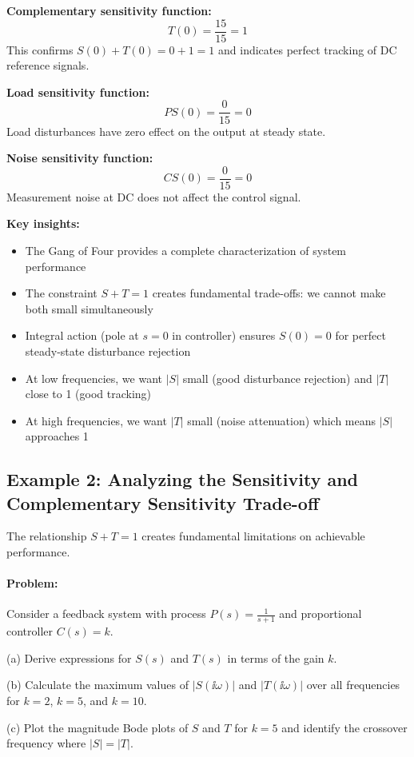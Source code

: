 \documentclass[11pt,a4paper]{article}
\begin{document}
\textbf{Complementary sensitivity function:}
\[
T(0) = \frac{15}{15} = 1
\]
This confirms $S(0) + T(0) = 0 + 1 = 1$ and indicates perfect tracking of DC reference signals.

\textbf{Load sensitivity function:}
\[
PS(0) = \frac{0}{15} = 0
\]
Load disturbances have zero effect on the output at steady state.

\textbf{Noise sensitivity function:}
\[
CS(0) = \frac{0}{15} = 0
\]
Measurement noise at DC does not affect the control signal.

\textbf{Key insights:}
\begin{itemize}
\item The Gang of Four provides a complete characterization of system performance
\item The constraint $S + T = 1$ creates fundamental trade-offs: we cannot make both small simultaneously
\item Integral action (pole at $s=0$ in controller) ensures $S(0) = 0$ for perfect steady-state disturbance rejection
\item At low frequencies, we want $|S|$ small (good disturbance rejection) and $|T|$ close to 1 (good tracking)
\item At high frequencies, we want $|T|$ small (noise attenuation) which means $|S|$ approaches 1
\end{itemize}

\subsection{Example 2: Analyzing the Sensitivity and Complementary Sensitivity Trade-off}

The relationship $S + T = 1$ creates fundamental limitations on achievable performance.

\paragraph{Problem:}
Consider a feedback system with process $P(s) = \frac{1}{s+1}$ and proportional controller $C(s) = k$.

(a) Derive expressions for $S(s)$ and $T(s)$ in terms of the gain $k$.

(b) Calculate the maximum values of $|S(\ii\omega)|$ and $|T(\ii\omega)|$ over all frequencies for $k = 2$, $k = 5$, and $k = 10$.

(c) Plot the magnitude Bode plots of $S$ and $T$ for $k = 5$ and identify the crossover frequency where $|S| = |T|$.
\end{document}
